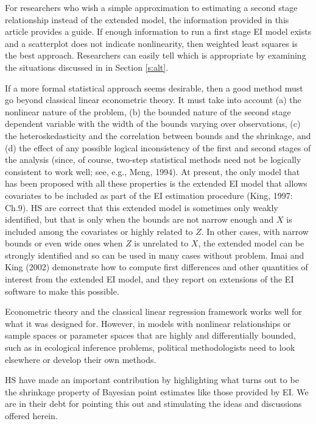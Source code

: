 \documentclass[11pt,titlepage]{article}
\begin{document}
For researchers who wish a simple approximation to estimating a second
stage relationship instead of the extended model, the information
provided in this article provides a guide.  If enough information to
run a first stage EI model exists and a scatterplot does not indicate
nonlinearity, then weighted least squares is the best approach.
Researchers can easily tell which is appropriate by examining the
situations discussed in in Section \ref{s:alt}.

If a more formal statistical approach seems desirable, then a good
method must go beyond classical linear econometric theory.  It must
take into account (a) the nonlinear nature of the problem, (b) the
bounded nature of the second stage dependent variable with the width
of the bounds varying over observations, (c) the heteroskedasticity
and the correlation between bounds and the shrinkage, and (d) the
effect of any possible logical inconsistency of the first and second
stages of the analysis (since, of course, two-step statistical methods
need not be logically consistent to work well; see, e.g., Meng, 1994).
At present, the only model that has been proposed with all these
properties is the extended EI model that allows covariates to be
included as part of the EI estimation procedure (King, 1997: Ch.9).
HS are correct that this extended model is sometimes only weakly
identified, but that is only when the bounds are not narrow enough and
$X$ is included among the covariates or highly related to $Z$.  In
other cases, with narrow bounds or even wide ones when $Z$ is
unrelated to $X$, the extended model can be strongly identified and so
can be used in many cases without problem.  Imai and King (2002)
demonstrate how to compute first differences and other quantities of
interest from the extended EI model, and they report on extensions of
the EI software to make this possible.

Econometric theory and the classical linear regression framework works
well for what it was designed for.  However, in models with nonlinear
relationships or sample spaces or parameter spaces that are highly and
differentially bounded, such as in ecological inference problems,
political methodologists need to look elsewhere or develop their own
methods.  

HS have made an important contribution by highlighting what turns out
to be the shrinkage property of Bayesian point estimates like those
provided by EI.  We are in their debt for pointing this out and
stimulating the ideas and discussions offered herein.
\end{document}
